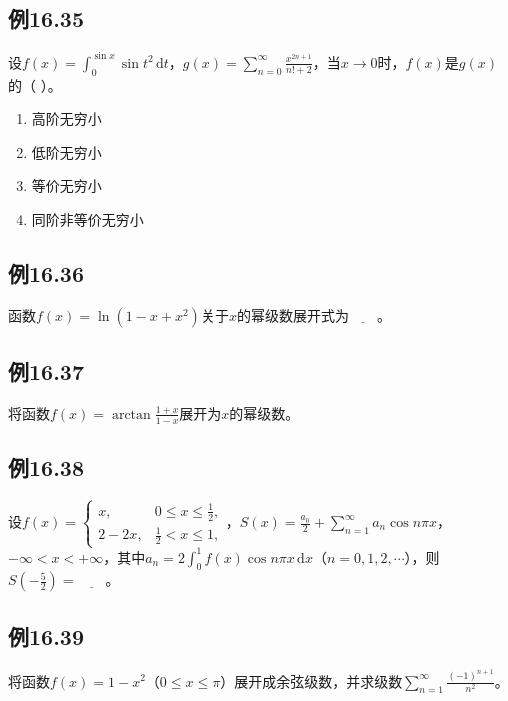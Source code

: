 \documentclass[UTF8]{ctexart}
\theoremstyle{remark}
\begin{document}
\begin{multicols}{2}
	\subsection*{例16.35}
	设\(f(x) = \int_{0}^{\sin x}\sin t^2\,\mathrm{d}t\)，\(g(x) = \sum_{n = 0}^{\infty}\frac{x^{2n + 1}}{n! + 2}\)，当\(x \to 0\)时，\(f(x)\)是\(g(x)\)的（  ）。
	\begin{enumerate}[label=(\Alph*)]
		\item 高阶无穷小
		\item 低阶无穷小
		\item 等价无穷小
		\item 同阶非等价无穷小
	\end{enumerate}
	
	\subsection*{例16.36}
	函数\(f(x) = \ln(1 - x + x^2)\)关于\(x\)的幂级数展开式为\(\underline{\quad\quad}\)。
	
	\subsection*{例16.37}
	将函数\(f(x) = \arctan\frac{1 + x}{1 - x}\)展开为\(x\)的幂级数。
	
	\subsection*{例16.38}
	设\(f(x) = \begin{cases} 
		x, & 0 \leqslant x \leqslant \frac{1}{2}, \\
		2 - 2x, & \frac{1}{2} < x \leqslant 1, 
	\end{cases}\)，\(S(x) = \frac{a_0}{2} + \sum_{n = 1}^{\infty}a_n\cos n\pi x\)，\(-\infty < x < +\infty\)，其中\(a_n = 2\int_{0}^{1}f(x)\cos n\pi x\,\mathrm{d}x\)（\(n = 0, 1, 2, \cdots\)），则\(S\left(-\frac{5}{2}\right) = \underline{\quad\quad}\)。
	
	\subsection*{例16.39}
	将函数\(f(x) = 1 - x^2\)（\(0 \leqslant x \leqslant \pi\)）展开成余弦级数，并求级数\(\sum_{n = 1}^{\infty}\frac{(-1)^{n + 1}}{n^2}\)。
\end{multicols}
\end{document}
